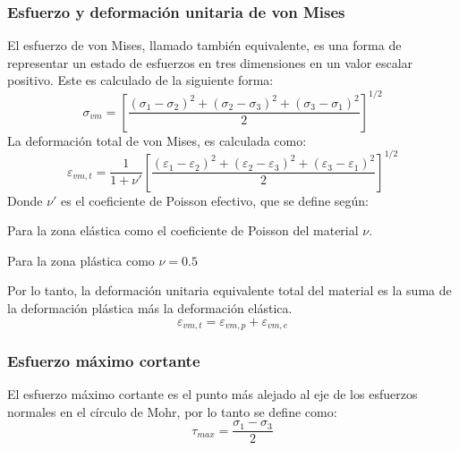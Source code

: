 \subsubsection{Esfuerzo y deformación unitaria de von Mises}
El esfuerzo de von Mises, llamado también equivalente, es una forma de representar un estado de esfuerzos en tres dimensiones en un valor escalar positivo. Este es calculado de la siguiente forma:
\begin{equation}
	\sigma_{vm} = \left[ \frac{(\sigma_1 - \sigma_2)^2 + (\sigma_2 - \sigma_3)^2 + (\sigma_3 - \sigma_1)^2}{2}\right]^{1/2}
\end{equation}
La deformación total de von Mises, es calculada como:
\begin{equation}
	\varepsilon_{vm,t} = \frac{1}{1+\nu'} \left[\frac{(\varepsilon_1 - \varepsilon_2)^2 + (\varepsilon_2 - \varepsilon_3)^2 + (\varepsilon_3 - \varepsilon_1)^2}{2}\right]^{1/2}
\end{equation}
Donde $\nu'$ es el coeficiente de Poisson efectivo, que se define según:
\begin{itemize*}
	\item Para la zona elástica como el coeficiente de Poisson del material $\nu$.
	\item Para la zona plástica como $\nu=0.5$
\end{itemize*}
Por lo tanto, la deformación unitaria equivalente total del material es la suma de la deformación plástica más la deformación elástica. 
\begin{equation}
	\varepsilon_{vm,t} = \varepsilon_{vm,p} + \varepsilon_{vm,e}
\end{equation}

\subsubsection{Esfuerzo máximo cortante}
El esfuerzo máximo cortante es el punto más alejado al eje de los esfuerzos normales en el círculo de Mohr, por lo tanto se define como:
\begin{equation}
	\tau_{max} = \frac{\sigma_1 - \sigma_3}{2}
\end{equation}

